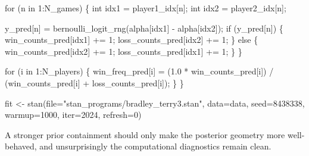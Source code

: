 \documentclass[
  letterpaper,
  DIV=11,
  numbers=noendperiod]{scrartcl}
\newenvironment{Shaded}{\begin{snugshade}}{\end{snugshade}}
\newcommand{\AttributeTok}[1]{\textcolor[rgb]{0.40,0.45,0.13}{#1}}
\newcommand{\ControlFlowTok}[1]{\textcolor[rgb]{0.00,0.23,0.31}{#1}}
\newcommand{\DataTypeTok}[1]{\textcolor[rgb]{0.68,0.00,0.00}{#1}}
\newcommand{\DecValTok}[1]{\textcolor[rgb]{0.68,0.00,0.00}{#1}}
\newcommand{\FloatTok}[1]{\textcolor[rgb]{0.68,0.00,0.00}{#1}}
\newcommand{\FunctionTok}[1]{\textcolor[rgb]{0.28,0.35,0.67}{#1}}
\newcommand{\NormalTok}[1]{\textcolor[rgb]{0.00,0.23,0.31}{#1}}
\newcommand{\OtherTok}[1]{\textcolor[rgb]{0.00,0.23,0.31}{#1}}
\newcommand{\SpecialCharTok}[1]{\textcolor[rgb]{0.37,0.37,0.37}{#1}}
\newcommand{\StringTok}[1]{\textcolor[rgb]{0.13,0.47,0.30}{#1}}
\begin{document}
\begin{codelisting}
\begin{Shaded}
\begin{Highlighting}[]
  \ControlFlowTok{for}\NormalTok{ (n }\ControlFlowTok{in} \DecValTok{1}\NormalTok{:N\_games) \{}
    \DataTypeTok{int}\NormalTok{ idx1 = player1\_idx[n];}
    \DataTypeTok{int}\NormalTok{ idx2 = player2\_idx[n];}

\NormalTok{    y\_pred[n] = bernoulli\_logit\_rng(alpha[idx1] {-} alpha[idx2]);}
    \ControlFlowTok{if}\NormalTok{ (y\_pred[n]) \{}
\NormalTok{      win\_counts\_pred[idx1] += }\DecValTok{1}\NormalTok{;}
\NormalTok{      loss\_counts\_pred[idx2] += }\DecValTok{1}\NormalTok{;}
\NormalTok{    \} }\ControlFlowTok{else}\NormalTok{ \{}
\NormalTok{      win\_counts\_pred[idx2] += }\DecValTok{1}\NormalTok{;}
\NormalTok{      loss\_counts\_pred[idx1] += }\DecValTok{1}\NormalTok{;}
\NormalTok{    \}}
\NormalTok{  \}}

  \ControlFlowTok{for}\NormalTok{ (i }\ControlFlowTok{in} \DecValTok{1}\NormalTok{:N\_players) \{}
\NormalTok{    win\_freq\_pred[i] =   (}\FloatTok{1.0}\NormalTok{ * win\_counts\_pred[i])}
\NormalTok{                       / (win\_counts\_pred[i] + loss\_counts\_pred[i]);}
\NormalTok{  \}}
\NormalTok{\}}
\end{Highlighting}
\end{Shaded}

\end{codelisting}

\begin{Shaded}
\begin{Highlighting}[]
\NormalTok{fit }\OtherTok{\textless{}{-}} \FunctionTok{stan}\NormalTok{(}\AttributeTok{file=}\StringTok{"stan\_programs/bradley\_terry3.stan"}\NormalTok{,}
            \AttributeTok{data=}\NormalTok{data, }\AttributeTok{seed=}\DecValTok{8438338}\NormalTok{,}
            \AttributeTok{warmup=}\DecValTok{1000}\NormalTok{, }\AttributeTok{iter=}\DecValTok{2024}\NormalTok{, }\AttributeTok{refresh=}\DecValTok{0}\NormalTok{)}
\end{Highlighting}
\end{Shaded}

A stronger prior containment should only make the posterior geometry
more well-behaved, and unsurprisingly the computational diagnostics
remain clean.

\begin{Shaded}
\end{Shaded}
\end{document}
